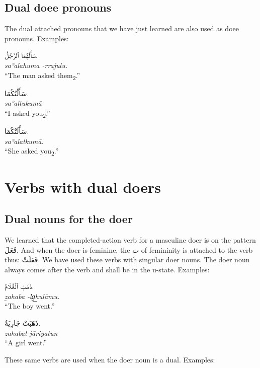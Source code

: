 \documentclass[
  10pt,
]{book}
\begin{document}
\subsection{Dual doee pronouns}\label{dual-doee-pronouns}

The dual attached pronouns that we have just learned are also used as doee pronouns.
Examples:

\foreignlanguage{arabic}{سَأَلَهُمَا ٱلرَّجُلُ.}\\
\emph{saʾalahuma -rrajulu.}\\
\enquote{The man asked them\textsubscript{2}.}

\foreignlanguage{arabic}{سَأَلْتُکُمَا.}\\
\emph{saʾaltukumā}\\
\enquote{I asked you\textsubscript{2}.}

\foreignlanguage{arabic}{سَأَلَتْکُمَا.}\\
\emph{saʾalatkumā.}\\
\enquote{She asked you\textsubscript{2}.}

\section{Verbs with dual doers}\label{verbs-with-dual-doers}

\subsection{Dual nouns for the doer}\label{dual-nouns-for-the-doer}

We learned that the completed-action verb for a masculine doer is on the pattern \foreignlanguage{arabic}{فَعَلَ}. And when the doer is feminine, the \foreignlanguage{arabic}{ت} of femininity is attached to the verb thus: \foreignlanguage{arabic}{فَعَلَتْ}. We have used these verbs with singular doer nouns. The doer noun always comes after the verb and shall be in the u-state. Examples:

\foreignlanguage{arabic}{ذَهَبَ ٱلْغُلَامُ.}\\
\emph{ẕahaba -lg͟hulāmu.}\\
\enquote{The boy went.}

\foreignlanguage{arabic}{ذَهَبَتْ جَارِيَةٌ.}\\
\emph{ẕahabat jāriyatun}\\
\enquote{A girl went.}

These same verbs are used when the doer noun is a dual. Examples:
\end{document}
